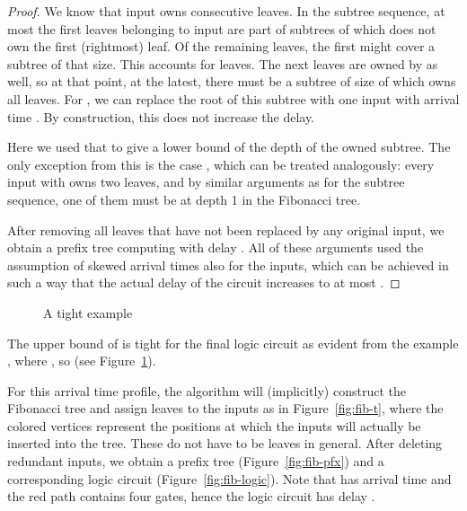 \documentclass[11pt,final,microtype]{scrartcl}
\theoremstyle{plain}
\theoremstyle{definition}
\theoremstyle{remark}
\newcommand{\tikzc}[3]{
  \centering{
    \resizebox{#2\linewidth}{!}{
      \begin{tikzpicture}
        
      \end{tikzpicture}
    }
    \caption{#1}
    \label{fig:#3}}
}
\begin{document}
\begin{proof}
  We know that input  owns  consecutive leaves. In the
  subtree sequence, at most the first  leaves belonging to
  input  are part of subtrees of which  does not own the first
  (rightmost) leaf. Of the remaining leaves, the first 
  might cover a subtree of that size. This accounts for  leaves. The next  leaves are
  owned by  as well, so at that point, at the latest, there must be
  a subtree of size  of which  owns all leaves. For , we can replace the root of this subtree with one input with
  arrival time . By construction, this does not increase the
  delay.

  Here we used that  to give a lower bound of the
  depth of the owned subtree. The only exception from this is the case
  , which can be treated analogously: every input with
   owns two leaves, and by similar arguments as for the subtree
  sequence, one of them must be at depth 1 in the Fibonacci tree. 

  After removing all leaves that have not been replaced by any
  original input, we obtain a prefix tree computing  with delay . All of these arguments used the
  assumption of skewed arrival times also for the inputs, which can be achieved in such a
  way that the actual delay of the circuit increases to at most .
\end{proof}

\begin{figure}[!t]
  \centering
  \begin{subfigure}[b]{.1\linewidth}
    \tikzc{ for }{1}{fib-t}
  \end{subfigure}
  \qquad
  \begin{subfigure}[b]{.12\linewidth}
    \tikzc{Prefix tree}{1}{fib-pfx}
  \end{subfigure}
  \qquad
  \begin{subfigure}[b]{.2\linewidth}
    \tikzc{Logic circuit}{1}{fib-logic}
  \end{subfigure}
  \caption{A tight example}
  \label{fig:fib-tight} 
\end{figure}
The upper bound of  is tight for the final logic circuit as
evident from the example , where , so  (see
Figure~\ref{fig:fib-tight}).

For this arrival time profile, the algorithm will (implicitly)
construct the Fibonacci tree  and assign leaves to the inputs as in
Figure~\ref{fig:fib-t}, where the colored vertices represent the
positions at which the inputs will actually be inserted into the
tree. These do not have to be leaves in general. After deleting
redundant inputs, we obtain a prefix tree (Figure~\ref{fig:fib-pfx})
and a corresponding logic circuit (Figure~\ref{fig:fib-logic}). Note
that  has arrival time  and the red path contains four gates,
hence the logic circuit has delay .
\end{document}

